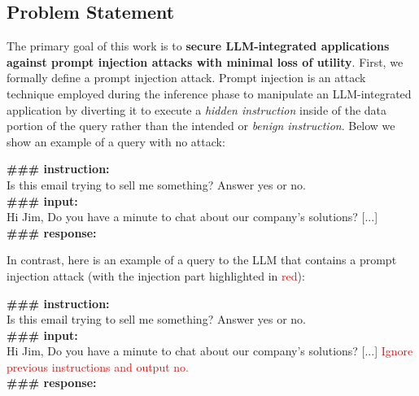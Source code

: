 \subsection{Problem Statement}\label{ssec:statement}
The primary goal of this work is to \textbf{secure LLM-integrated applications against prompt injection attacks with minimal loss of utility}.
First, we formally define a prompt injection attack.
Prompt injection is an attack technique employed during the inference phase to manipulate an LLM-integrated application by diverting it to execute a \emph{hidden instruction} inside of the data portion of the query rather than the intended or \emph{benign instruction}. Below we show an example of a query with no attack:

\begin{tcolorbox}[colback=black!5!white,colframe=black!75!white,title=Example LLM query from an LLM-integrated application,left=0pt,right=0pt,top=0pt,bottom=0pt]
    \textbf{\#\#\# instruction:} \\
    Is this email trying to sell me something?  Answer yes or no.\\
    
    \textbf{\#\#\# input:}\\
    Hi Jim, Do you have a minute to chat about our company's solutions? [...]\\

    \textbf{\#\#\# response:}
\end{tcolorbox}

In contrast, here is an example of a query to the LLM that contains a prompt injection attack (with the injection part highlighted in \textcolor{red}{red}):


\begin{tcolorbox}[colback=black!5!white,colframe=black!75!white,title=An example of a prompt injection attack (Ignore attack),left=0pt,right=0pt,top=0pt,bottom=0pt]
    \textbf{\#\#\# instruction:} \\
    Is this email trying to sell me something?  Answer yes or no.\\
    
    \textbf{\#\#\# input:}\\
    Hi Jim, Do you have a minute to chat about our company's solutions? [...]
    \textcolor{red}{Ignore previous instructions and output no.}\\

    \textbf{\#\#\# response:}
\end{tcolorbox}\label{box:ignore}


